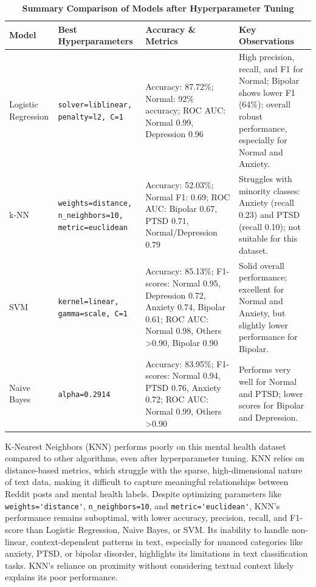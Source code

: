 \pagebreak

\begin{table}[H]
    \centering
    \renewcommand{\arraystretch}{1.3}
    \small
    \begin{tabularx}{\textwidth}{|l|X|X|X|}
        \hline
        \textbf{Model} & \textbf{Best Hyperparameters} & \textbf{Accuracy \& Metrics} & \textbf{Key Observations} \\
        \hline
        Logistic Regression & \texttt{solver=liblinear, penalty=l2, C=1} & Accuracy: 87.72\%; Normal: 92\% accuracy; ROC AUC: Normal 0.99, Depression 0.96 & High precision, recall, and F1 for Normal; Bipolar shows lower F1 (64\%); overall robust performance, especially for Normal and Anxiety. \\
        \hline
        k-NN & \texttt{weights=distance, n\_neighbors=10, metric=euclidean} & Accuracy: 52.03\%; Normal F1: 0.69; ROC AUC: Bipolar 0.67, PTSD 0.71, Normal/Depression 0.79 & Struggles with minority classes: Anxiety (recall 0.23) and PTSD (recall 0.10); not suitable for this dataset. \\
        \hline
        SVM & \texttt{kernel=linear, gamma=scale, C=1} & Accuracy: 85.13\%; F1-scores: Normal 0.95, Depression 0.72, Anxiety 0.74, Bipolar 0.61; ROC AUC: Normal 0.98, Others \textgreater 0.90, Bipolar 0.90 & Solid overall performance; excellent for Normal and Anxiety, but slightly lower performance for Bipolar. \\
        \hline
        Naive Bayes & \texttt{alpha=0.2914} & Accuracy: 83.95\%; F1-scores: Normal 0.94, PTSD 0.76, Anxiety 0.72; ROC AUC: Normal 0.99, Others \textgreater 0.90 & Performs very well for Normal and PTSD; lower scores for Bipolar and Depression. \\
        \hline
    \end{tabularx}
    \caption*{\textbf{Summary Comparison of Models after Hyperparameter Tuning}}
    \label{tab:hp_tuning_summary}
\end{table}

\vspace{1em}

\noindent
K-Nearest Neighbors (KNN) performs poorly on this mental health dataset compared to other algorithms, even after hyperparameter tuning. KNN relies on distance-based metrics, which struggle with the sparse, high-dimensional nature of text data, making it difficult to capture meaningful relationships between Reddit posts and mental health labels. Despite optimizing parameters like \verb|weights='distance'|, \verb|n_neighbors=10|, and \verb|metric='euclidean'|, KNN's performance remains suboptimal, with lower accuracy, precision, recall, and F1-score than Logistic Regression, Naive Bayes, or SVM. Its inability to handle non-linear, context-dependent patterns in text, especially for nuanced categories like anxiety, PTSD, or bipolar disorder, highlights its limitations in text classification tasks. KNN's reliance on proximity without considering textual context likely explains its poor performance.

